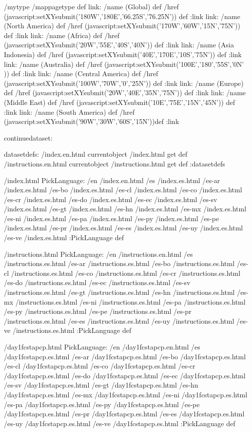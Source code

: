 \begin{ingrid}
/mytype /mappagetype def
link:
/name (Global) def
/href (javascript:setXYsubmit('180W','180E','66.25S','76.25N')) def
:link
link:
/name (North America) def
/href (javascript:setXYsubmit('170W','60W','15N','75N')) def
:link
link:
/name (Africa) def
/href (javascript:setXYsubmit('20W','55E','40S','40N')) def
:link
link:
/name (Asia Indonesia) def
/href (javascript:setXYsubmit('40E','170E','10S','75N')) def
:link
link:
/name (Australia) def
/href (javascript:setXYsubmit('100E','180','55S','0N' )) def
:link
link:
/name (Central America) def
/href (javascript:setXYsubmit('100W','70W','0','25N')) def
:link
link:
/name (Europe) def
/href (javascript:setXYsubmit('20W','40E','35N','75N')) def
:link
link:
/name (Middle East) def
/href (javascript:setXYsubmit('10E','75E','15N','45N')) def
:link
link:
/name (South America) def
/href (javascript:setXYsubmit('90W','30W','60S','15N'))def
:link

continuedataset:

datasetdefs:
/index.en.html currentobject /index.html get def
/instructions.en.html currentobject /instructions.html get def
:datasetdefs

/index.html {
PickLanguage:
/en /index.en.html
/es /index.es.html
/es-ar /index.es.html
/es-bo /index.es.html
/es-cl /index.es.html
/es-co /index.es.html
/es-cr /index.es.html
/es-do /index.es.html
/es-ec /index.es.html
/es-sv /index.es.html
/es-gt /index.es.html
/es-hn /index.es.html
/es-mx /index.es.html
/es-ni /index.es.html
/es-pa /index.es.html
/es-py /index.es.html
/es-pe /index.es.html
/es-pr /index.es.html
/es-es /index.es.html
/es-uy /index.es.html
/es-ve /index.es.html
:PickLanguage
} def

/instructions.html {
PickLanguage:
/en /instructions.en.html
/es /instructions.es.html
/es-ar /instructions.es.html
/es-bo /instructions.es.html
/es-cl /instructions.es.html
/es-co /instructions.es.html
/es-cr /instructions.es.html
/es-do /instructions.es.html
/es-ec /instructions.es.html
/es-sv /instructions.es.html
/es-gt /instructions.es.html
/es-hn /instructions.es.html
/es-mx /instructions.es.html
/es-ni /instructions.es.html
/es-pa /instructions.es.html
/es-py /instructions.es.html
/es-pe /instructions.es.html
/es-pr /instructions.es.html
/es-es /instructions.es.html
/es-uy /instructions.es.html
/es-ve /instructions.es.html
:PickLanguage
} def

/day1fcstapcp.html {
PickLanguage:
/en /day1fcstapcp.en.html
/es /day1fcstapcp.es.html
/es-ar /day1fcstapcp.es.html
/es-bo /day1fcstapcp.es.html
/es-cl /day1fcstapcp.es.html
/es-co /day1fcstapcp.es.html
/es-cr /day1fcstapcp.es.html
/es-do /day1fcstapcp.es.html
/es-ec /day1fcstapcp.es.html
/es-sv /day1fcstapcp.es.html
/es-gt /day1fcstapcp.es.html
/es-hn /day1fcstapcp.es.html
/es-mx /day1fcstapcp.es.html
/es-ni /day1fcstapcp.es.html
/es-pa /day1fcstapcp.es.html
/es-py /day1fcstapcp.es.html
/es-pe /day1fcstapcp.es.html
/es-pr /day1fcstapcp.es.html
/es-es /day1fcstapcp.es.html
/es-uy /day1fcstapcp.es.html
/es-ve /day1fcstapcp.es.html
:PickLanguage
} def


\end{ingrid}
